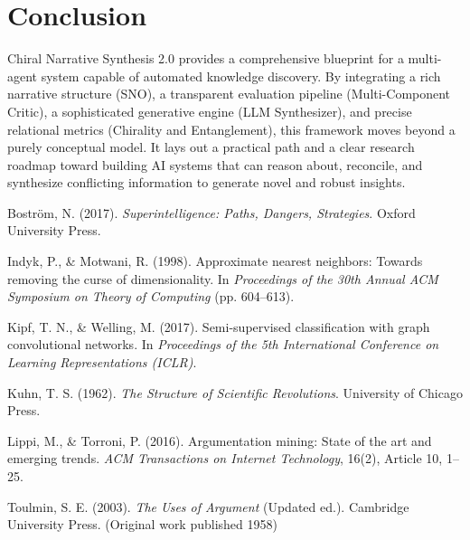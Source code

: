 \documentclass[12pt, a4paper]{article}
\begin{document}
\section{Conclusion}
Chiral Narrative Synthesis 2.0 provides a comprehensive blueprint for a multi-agent system capable of automated knowledge discovery. By integrating a rich narrative structure (SNO), a transparent evaluation pipeline (Multi-Component Critic), a sophisticated generative engine (LLM Synthesizer), and precise relational metrics (Chirality and Entanglement), this framework moves beyond a purely conceptual model. It lays out a practical path and a clear research roadmap toward building AI systems that can reason about, reconcile, and synthesize conflicting information to generate novel and robust insights.


\begin{thebibliography}{99}

Boström, N. (2017).
\textit{Superintelligence: Paths, Dangers, Strategies}.
Oxford University Press.

Indyk, P., \& Motwani, R. (1998).
Approximate nearest neighbors: Towards removing the curse of dimensionality.
In \textit{Proceedings of the 30th Annual ACM Symposium on Theory of Computing} (pp. 604--613).

Kipf, T. N., \& Welling, M. (2017).
Semi-supervised classification with graph convolutional networks.
In \textit{Proceedings of the 5th International Conference on Learning Representations (ICLR)}.

Kuhn, T. S. (1962).
\textit{The Structure of Scientific Revolutions}.
University of Chicago Press.

Lippi, M., \& Torroni, P. (2016).
Argumentation mining: State of the art and emerging trends.
\textit{ACM Transactions on Internet Technology}, 16(2), Article 10, 1--25.

Toulmin, S. E. (2003).
\textit{The Uses of Argument} (Updated ed.).
Cambridge University Press. (Original work published 1958)

\end{thebibliography}
\end{document}
